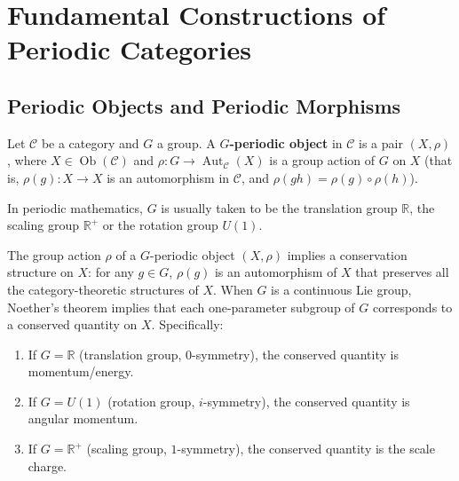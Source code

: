 \section{Fundamental Constructions of Periodic Categories}\label{sec:periodic_category_basic}

\subsection{Periodic Objects and Periodic Morphisms}

\begin{definition}\label{def:periodic_object}
Let $\mathcal{C}$ be a category and $G$ a group. A \textbf{$G$-periodic object} in $\mathcal{C}$ is a pair $(X, \rho)$, where $X \in \operatorname{Ob}(\mathcal{C})$ and $\rho: G \to \operatorname{Aut}_{\mathcal{C}}(X)$ is a group action of $G$ on $X$ (that is, $\rho(g): X \to X$ is an automorphism in $\mathcal{C}$, and $\rho(gh) = \rho(g) \circ \rho(h)$).

In periodic mathematics, $G$ is usually taken to be the translation group $\mathbb{R}$, the scaling group $\mathbb{R}^+$ or the rotation group $U(1)$.
\end{definition}

\begin{proposition}\label{prop:periodic_object_conservation}
The group action $\rho$ of a $G$-periodic object $(X, \rho)$ implies a conservation structure on $X$: for any $g \in G$, $\rho(g)$ is an automorphism of $X$ that preserves all the category-theoretic structures of $X$. When $G$ is a continuous Lie group, Noether's theorem implies that each one-parameter subgroup of $G$ corresponds to a conserved quantity on $X$. Specifically:
\begin{enumerate}[label=(\roman*)]
    \item If $G = \mathbb{R}$ (translation group, $0$-symmetry), the conserved quantity is momentum/energy.
    \item If $G = U(1)$ (rotation group, $i$-symmetry), the conserved quantity is angular momentum.
    \item If $G = \mathbb{R}^+$ (scaling group, $1$-symmetry), the conserved quantity is the scale charge.
\end{enumerate}
\end{proposition}

